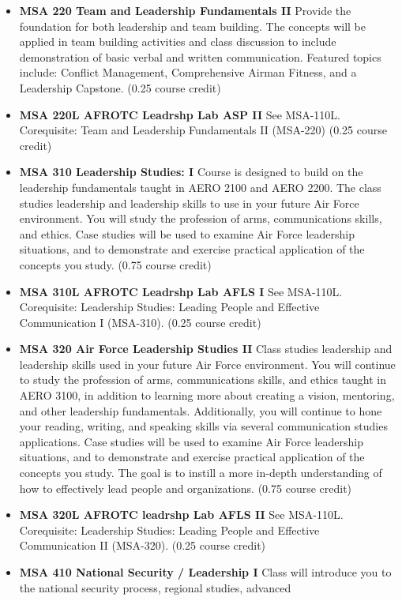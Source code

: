 \documentclass[
  letterpaper,
]{scrbook}
\begin{document}
\begin{itemize}
\item
  \textbf{MSA 220 Team and Leadership Fundamentals II} Provide the
  foundation for both leadership and team building. The concepts will be
  applied in team building activities and class discussion to include
  demonstration of basic verbal and written communication. Featured
  topics include: Conflict Management, Comprehensive Airman Fitness, and
  a Leadership Capstone. (0.25 course credit)
\item
  \textbf{MSA 220L AFROTC Leadrshp Lab ASP II} See MSA-110L.
  Corequisite: Team and Leadership Fundamentals II (MSA-220) (0.25
  course credit)
\item
  \textbf{MSA 310 Leadership Studies: I} Course is designed to build on
  the leadership fundamentals taught in AERO 2100 and AERO 2200. The
  class studies leadership and leadership skills to use in your future
  Air Force environment. You will study the profession of arms,
  communications skills, and ethics. Case studies will be used to
  examine Air Force leadership situations, and to demonstrate and
  exercise practical application of the concepts you study. (0.75 course
  credit)
\item
  \textbf{MSA 310L AFROTC Leadrshp Lab AFLS I} See MSA-110L.
  Corequisite: Leadership Studies: Leading People and Effective
  Communication I (MSA-310). (0.25 course credit)
\item
  \textbf{MSA 320 Air Force Leadership Studies II} Class studies
  leadership and leadership skills used in your future Air Force
  environment. You will continue to study the profession of arms,
  communications skills, and ethics taught in AERO 3100, in addition to
  learning more about creating a vision, mentoring, and other leadership
  fundamentals. Additionally, you will continue to hone your reading,
  writing, and speaking skills via several communication studies
  applications. Case studies will be used to examine Air Force
  leadership situations, and to demonstrate and exercise practical
  application of the concepts you study. The goal is to instill a more
  in-depth understanding of how to effectively lead people and
  organizations. (0.75 course credit)
\item
  \textbf{MSA 320L AFROTC leadrshp Lab AFLS II} See MSA-110L.
  Corequisite: Leadership Studies: Leading People and Effective
  Communication II (MSA-320). (0.25 course credit)
\item
  \textbf{MSA 410 National Security / Leadership I} Class will introduce
  you to the national security process, regional studies, advanced

\end{itemize}
\end{document}
